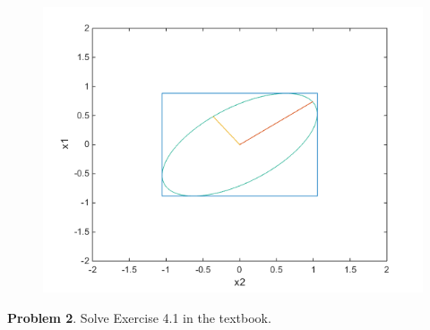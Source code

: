\documentclass[10pt]{article}
\begin{document}
{\centering
\begin{figure} [H]
\includegraphics  {CBE660_Assign9__1d.png}
\end{figure} }




\newpage

\noindent\colorbox{mygray}{\begin{minipage}{\textwidth}
  {\bf Problem 2}. Solve Exercise 4.1 in the textbook.
  \end{minipage}}
\\
\end{document}
